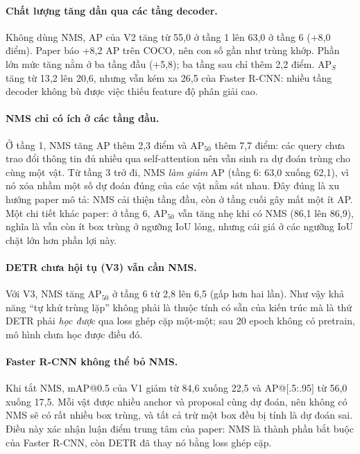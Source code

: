 \documentclass[11pt, a4paper]{article}
\begin{document}
\paragraph{Chất lượng tăng dần qua các tầng decoder.} Không dùng NMS, AP của V2 tăng từ 55,0 ở tầng 1 lên 63,0 ở tầng 6 (+8,0 điểm). Paper báo +8,2 AP trên COCO, nên con số gần như trùng khớp. Phần lớn mức tăng nằm ở ba tầng đầu (+5,8); ba tầng sau chỉ thêm 2,2 điểm. AP$_S$ tăng từ 13,2 lên 20,6, nhưng vẫn kém xa 26,5 của Faster R-CNN: nhiều tầng decoder không bù được việc thiếu feature độ phân giải cao.

\paragraph{NMS chỉ có ích ở các tầng đầu.} Ở tầng 1, NMS tăng AP thêm 2,3 điểm và AP$_{50}$ thêm 7,7 điểm: các query chưa trao đổi thông tin đủ nhiều qua self-attention nên vẫn sinh ra dự đoán trùng cho cùng một vật. Từ tầng 3 trở đi, NMS \emph{làm giảm} AP (tầng 6: 63,0 xuống 62,1), vì nó xóa nhầm một số dự đoán đúng của các vật nằm sát nhau. Đây đúng là xu hướng paper mô tả: NMS cải thiện tầng đầu, còn ở tầng cuối gây mất một ít AP. Một chi tiết khác paper: ở tầng 6, AP$_{50}$ vẫn tăng nhẹ khi có NMS (86,1 lên 86,9), nghĩa là vẫn còn ít box trùng ở ngưỡng IoU lỏng, nhưng cái giá ở các ngưỡng IoU chặt lớn hơn phần lợi này.

\paragraph{DETR chưa hội tụ (V3) vẫn cần NMS.} Với V3, NMS tăng AP$_{50}$ ở tầng 6 từ 2,8 lên 6,5 (gấp hơn hai lần). Như vậy khả năng ``tự khử trùng lặp'' không phải là thuộc tính có sẵn của kiến trúc mà là thứ DETR phải \emph{học được} qua loss ghép cặp một-một; sau 20 epoch không có pretrain, mô hình chưa học được điều đó.

\paragraph{Faster R-CNN không thể bỏ NMS.} Khi tắt NMS, mAP@0.5 của V1 giảm từ 84,6 xuống 22,5 và AP@[.5:.95] từ 56,0 xuống 17,5. Mỗi vật được nhiều anchor và proposal cùng dự đoán, nên không có NMS sẽ có rất nhiều box trùng, và tất cả trừ một box đều bị tính là dự đoán sai. Điều này xác nhận luận điểm trung tâm của paper: NMS là thành phần bắt buộc của Faster R-CNN, còn DETR đã thay nó bằng loss ghép cặp.


\end{document}
